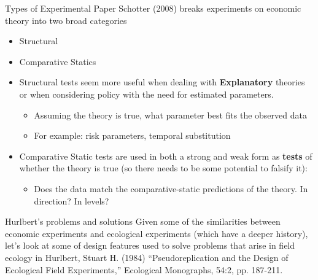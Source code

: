 \documentclass{beamer}
\begin{document}
\begin{frame}{Types of Experimental Paper}
Schotter (2008) breaks experiments on economic theory into two broad categories\pause

\begin{itemize}
	\item Structural
	\item Comparative Statics
\end{itemize}

\end{frame}

\begin{frame}
\begin{itemize}
	\item Structural tests seem more useful when dealing with \textbf{Explanatory} theories or when considering policy with the need for estimated parameters.
	\begin{itemize}
		\item Assuming the theory is true, what parameter best fits the observed data
		\item For example: risk parameters, temporal substitution
	\end{itemize}
	\item Comparative Static tests are used in both a strong and weak form as \textbf{tests} of whether the theory is true (so there needs to be some potential to falsify it):
	\begin{itemize}
		\item Does the data match the comparative-static predictions of the theory. In direction? In levels?
	\end{itemize}
\end{itemize}

\end{frame}
\begin{frame}{Hurlbert's problems and solutions}
Given some of the similarities between economic experiments and ecological experiments (which have a deeper history), let's look at some of design features used to solve problems that arise in field ecology in Hurlbert, Stuart H. (1984) ``Pseudoreplication and the Design of Ecological Field
Experiments,'' Ecological Monographs, 54:2, pp. 187-211.
\end{frame}
\end{document}
